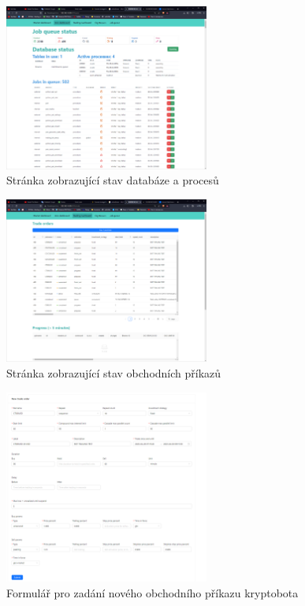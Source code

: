 \begin{figure}[b]
    \centering
    \includegraphics[width=0.6\textwidth]{Figures/web/jobs-dashboard.png}
    \caption{Stránka zobrazující stav databáze a procesů}
    \label{fig:web:jobs-dashboard}
\end{figure}

\begin{figure}[b]
    \centering
    \includegraphics[width=0.6\textwidth]{Figures/web/trade-dashboard.png}
    \caption{Stránka zobrazující stav obchodních příkazů}
    \label{fig:web:trade-dashboard}
\end{figure}

\begin{figure}[b]
    \centering
    \includegraphics[width=0.6\textwidth]{Figures/web/new-order.png}
    \caption{Formulář pro zadání nového obchodního příkazu kryptobota}
    \label{fig:web:new-order}
\end{figure}

